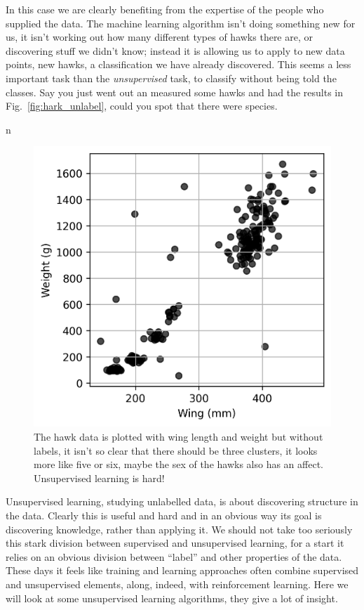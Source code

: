 \documentclass[12pt]{article}
\begin{document}
In this case we are clearly benefiting from the expertise of the
people who supplied the data. The machine learning algorithm isn't
doing something new for us, it isn't working out how many different
types of hawks there are, or discovering stuff we didn't know; instead
it is allowing us to apply to new data points, new hawks, a
classification we have already discovered. This seems a less important
task than the \textsl{unsupervised} task, to classify without being
told the classes. Say you just went out an measured some hawks and had
the results in Fig.~\ref{fig:hark_unlabel}, could you spot that there were species.


n\begin{figure}[htb]
\begin{center}  
  \includegraphics{hawks_plot_unlabel.png}
\end{center}
\caption{The hawk data is plotted with wing length and weight but without labels, it isn't so clear that there should be three clusters, it looks more like five or six, maybe the sex of the hawks also has an affect. Unsupervised learning is hard!\label{fig:hawks_unlabel}}
\end{figure}

Unsupervised learning, studying unlabelled data, is about discovering
structure in the data. Clearly this is useful and hard and in an
obvious way its goal is discovering knowledge, rather than applying
it. We should not take too seriously this stark division between
supervised and unsupervised learning, for a start it relies on an
obvious division between ``label'' and other properties of the
data. These days it feels like training and learning approaches often
combine supervised and unsupervised elements, along, indeed, with
reinforcement learning. Here we will look at some unsupervised
learning algorithms, they give a lot of insight.
\end{document}
